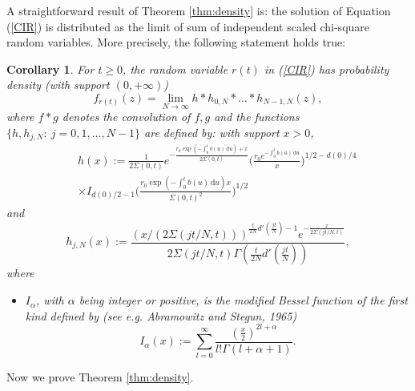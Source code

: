 \documentclass[6pt]{article}
\def\ud{\, \mathrm{d}}
\newtheorem{corollary}[theorem]{Corollary}
\numberwithin{equation}{section}
\begin{document}
A straightforward result of Theorem \ref{thm:density} is: the solution of Equation (\ref{CIR}) is distributed as the limit of sum of independent scaled chi-square random variables. More precisely, the following statement holds true:
\begin{corollary}
\label{cor1}
For $t\ge0$, the random variable $r(t)$ in (\ref{CIR}) has probability density (with support $(0,+\infty)$)
\begin{equation}
\label{density}
f_{r(t)}(z)=\lim\limits_{N\rightarrow\infty}h*h_{0,N}*\ldots*h_{N-1,N}(z),
\end{equation}
where $f*g$ denotes the convolution of $f,g$ and the functions $\{h,h_{j,N}:~j=0,1,\ldots,N-1\}$ are defined by: with support $x>0$,
\begin{eqnarray}
\label{h}
&&h(x):=\frac{1}{2\Sigma(0,t)}e^{-\frac{r_0\exp(-\int_0^tb(u)\ud u)+x}{2\Sigma(0,t)}}\Big(\frac{r_0e^{-\int_0^tb(u)\ud u}}{x}\Big)^{1/2-d(0)/4}\nonumber\\
&&\times I_{d(0)/2-1}\Big(\frac{r_0\exp(-\int_0^tb(u)\ud u)x}{\Sigma(0,t)^2}\Big)^{1/2}
\end{eqnarray}
and
\begin{equation}
\label{qJN}
h_{j,N}(x):=\frac{\left(x/(2\Sigma(jt/N,t))\right)^{\frac{t}{2N}d'(\frac{jt}{N})-1}e^{-\frac{x}{2\Sigma(jt/N,t)}}}{2\Sigma(jt/N,t)\Gamma\left(\frac{t}{2N}d'(\frac{jt}{N})\right)},
\end{equation}
where
\begin{itemize}
\item $I_{\alpha}$, with $\alpha$ being integer or positive, is the  modified Bessel function of the first kind defined by (see e.g. Abramowitz and Stegun, 1965)
$$
I_\alpha(x):=\sum_{l=0}^{\infty}\frac{(\frac{x}{2})^{2l+\alpha}}{l!\Gamma(l+\alpha+1)}.
$$
\end{itemize}
\end{corollary}
Now we prove Theorem \ref{thm:density}.
\end{document}
